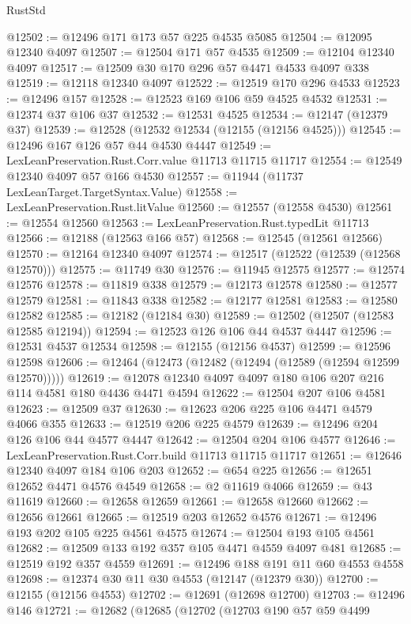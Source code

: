 \begin{lexlean}{RustStd}
\begin{coremodule}
{\begin{coremodule}
{{{{{{{{{{{{{{{{{{{{{{{{{{{{{{{{{{{{{{{{{{{{{{{{{{{{{{{{{{{{{{{{{{{{@12502 := @12496 @171 @173 @57 @225 @4535 @5085
@12504 := @12095 @12340 @4097
@12507 := @12504 @171 @57 @4535
@12509 := @12104 @12340 @4097
@12517 := @12509 @30 @170 @296 @57 @4471 @4533 @4097 @338
@12519 := @12118 @12340 @4097
@12522 := @12519 @170 @296 @4533
@12523 := @12496 @157
@12528 := @12523 @169 @106 @59 @4525 @4532
@12531 := @12374 @37 @106 @37
@12532 := @12531 @4525
@12534 := @12147 (@12379 @37)
@12539 := @12528 (@12532 @12534 (@12155 (@12156 @4525)))
@12545 := @12496 @167 @126 @57 @44 @4530 @4447
@12549 := LexLeanPreservation.Rust.Corr.value @11713 @11715 @11717
@12554 := @12549 @12340 @4097 @57 @166 @4530
@12557 := @11944 (@11737 LexLeanTarget.TargetSyntax.Value)
@12558 := LexLeanPreservation.Rust.litValue
@12560 := @12557 (@12558 @4530)
@12561 := @12554 @12560
@12563 := LexLeanPreservation.Rust.typedLit @11713
@12566 := @12188 (@12563 @166 @57)
@12568 := @12545 (@12561 @12566)
@12570 := @12164 @12340 @4097
@12574 := @12517 (@12522 (@12539 (@12568 @12570)))
@12575 := @11749 @30
@12576 := @11945 @12575
@12577 := @12574 @12576
@12578 := @11819 @338
@12579 := @12173 @12578
@12580 := @12577 @12579
@12581 := @11843 @338
@12582 := @12177 @12581
@12583 := @12580 @12582
@12585 := @12182 (@12184 @30)
@12589 := @12502 (@12507 (@12583 @12585 @12194))
@12594 := @12523 @126 @106 @44 @4537 @4447
@12596 := @12531 @4537 @12534
@12598 := @12155 (@12156 @4537)
@12599 := @12596 @12598
@12606 := @12464 (@12473 (@12482 (@12494 (@12589 (@12594 @12599 @12570)))))
@12619 := @12078 @12340 @4097 @4097 @180 @106 @207 @216 @114 @4581 @180 @4436 @4471 @4594
@12622 := @12504 @207 @106 @4581
@12623 := @12509 @37
@12630 := @12623 @206 @225 @106 @4471 @4579 @4066 @355
@12633 := @12519 @206 @225 @4579
@12639 := @12496 @204 @126 @106 @44 @4577 @4447
@12642 := @12504 @204 @106 @4577
@12646 := LexLeanPreservation.Rust.Corr.build @11713 @11715 @11717
@12651 := @12646 @12340 @4097 @184 @106 @203
@12652 := @654 @225
@12656 := @12651 @12652 @4471 @4576 @4549
@12658 := @2 @11619 @4066
@12659 := @43 @11619
@12660 := @12658 @12659
@12661 := @12658 @12660
@12662 := @12656 @12661
@12665 := @12519 @203 @12652 @4576
@12671 := @12496 @193 @202 @105 @225 @4561 @4575
@12674 := @12504 @193 @105 @4561
@12682 := @12509 @133 @192 @357 @105 @4471 @4559 @4097 @481
@12685 := @12519 @192 @357 @4559
@12691 := @12496 @188 @191 @11 @60 @4553 @4558
@12698 := @12374 @30 @11 @30 @4553 (@12147 (@12379 @30))
@12700 := @12155 (@12156 @4553)
@12702 := @12691 (@12698 @12700)
@12703 := @12496 @146
@12721 := @12682
    (@12685
      (@12702
        (@12703
          @190
          @57
          @59
          @4499
}}}}}}}}}}}}}}}}}}}}}}}}}}}}}}}}}}}}}}}}}}}}}}}}}}}}}}}}}}}}}}}}}}}}
\end{coremodule}}
\end{coremodule}
\end{lexlean}
